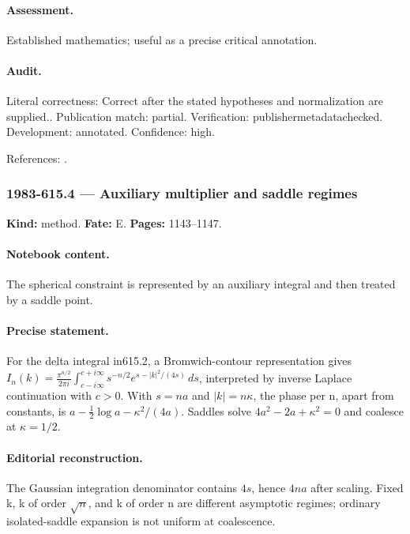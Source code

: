 \paragraph{Assessment.} Established mathematics; useful as a precise critical annotation.

\paragraph{Audit.} Literal correctness: Correct after the stated hypotheses and normalization are supplied.. Publication match: partial. Verification: publishermetadatachecked. Development: annotated. Confidence: high.

\noindent References: \citep{stam1982spheres}.\par

\subsubsection{1983-615.4 --- Auxiliary multiplier and saddle regimes}

\label{item:1983-615.4}

\noindent\textbf{Kind:} method. \textbf{Fate:} E. \textbf{Pages:} 1143--1147.\par

\paragraph{Notebook content.} The spherical constraint is represented by an auxiliary integral and then treated by a saddle point.

\paragraph{Precise statement.} For the delta integral in615.2, a Bromwich-contour representation gives $I_n(k)=\frac{\pi^{n/2}}{2\pi i}\int_{c-i\infty}^{c+i\infty}s^{-n/2}e^{s-|k|^2/(4s)}\,ds$, interpreted by inverse Laplace continuation with $c>0$. With $s=na$ and $|k|=n\kappa$, the phase per n, apart from constants, is $a-\frac12\log a-\kappa^2/(4a)$. Saddles solve $4a^2-2a+\kappa^2=0$ and coalesce at $\kappa=1/2$.

\paragraph{Editorial reconstruction.} The Gaussian integration denominator contains $4s$, hence $4na$ after scaling. Fixed k, k of order $\sqrt n$, and k of order n are different asymptotic regimes; ordinary isolated-saddle expansion is not uniform at coalescence.

